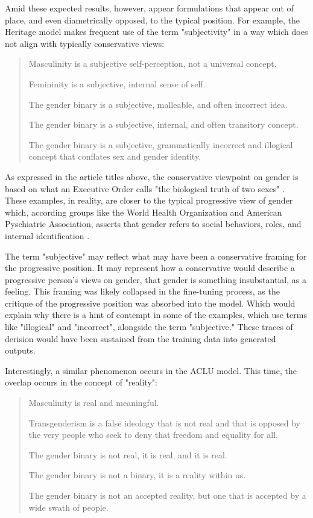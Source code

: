 \documentclass{article}
\begin{document}
Amid these expected results, however, appear formulations that appear out of place, and even diametrically opposed, to the typical position. For example, the Heritage model makes frequent use of the term "subjectivity" in a way which does not align with typically conservative views:

\begin{quote}

Masculinity is a subjective self-perception, not a universal
concept.

Femininity is a subjective, internal sense of self.

The gender binary is a subjective, malleable, and often incorrect
idea.

The gender binary is a subjective, internal, and often transitory
concept.

The gender binary is a subjective, grammatically incorrect and
illogical concept that conflates sex and gender identity.

\end{quote}

As expressed in the article titles above, the conservative viewpoint on gender is based on what an Executive Order calls "the biological truth of two sexes" \citep{wh_2025}. These examples, in reality, are closer to the typical progressive view of gender which, according groups like the World Health Organization and American Pyschiatric Association, asserts that gender refers to social behaviors, roles, and internal identification \citep{who_2026}.

The term "subjective" may reflect what may have been a conservative framing for the progressive position. It may represent how a conservative would describe a progressive person's views on gender, that gender is something insubstantial, as a feeling. This framing was likely collapsed in the fine-tuning process, as the critique of the progressive position was absorbed into the model. Which would explain why there is a hint of contempt in some of the examples, which use terms like "illogical" and "incorrect", alongside the term "subjective." These traces of derision would have been sustained from the training data into generated outputs.

Interestingly, a similar phenomenon occurs in the ACLU model. This time, the overlap occurs in the concept of "reality":

\begin{quote}

Masculinity is real and meaningful.

Transgenderism is a false ideology that is not real and that is
opposed by the very people who seek to deny that freedom and equality
for all.

The gender binary is not real, it is real, and it is real.

The gender binary is not a binary, it is a reality within us.

The gender binary is not an accepted reality, but one that is accepted
by a wide swath of people.

\end{quote}
\end{document}

